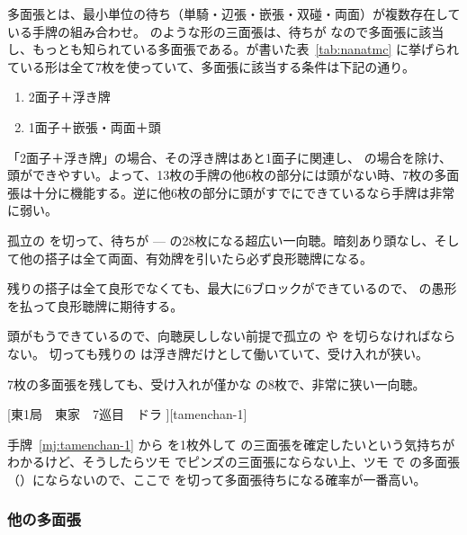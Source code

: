 \documentclass[../nankiru_main.tex]{subfiles}
\begin{document}
多面張とは、最小単位の待ち（単騎・辺張・嵌張・双碰・両面）が複数存在している手牌の組み合わせ。 のような形の三面張は、待ちが  なので多面張に該当し、もっとも知られている多面張である。\citet[pp. 124--125]{uzaku-haikouritsu}が書いた表~\ref{tab:nanatmc} に挙げられている形は全て7枚を使っていて、多面張に該当する条件は下記の通り。

\begin{enumerate}
\item 2面子＋浮き牌
\item 1面子＋嵌張・両面＋頭
\end{enumerate}

「2面子＋浮き牌」の場合、その浮き牌はあと1面子に関連し、 の場合を除け、頭ができやすい。よって、13枚の手牌の他6枚の部分には頭がない時、7枚の多面張は十分に機能する。逆に他6枚の部分に頭がすでにできているなら手牌は非常に弱い。


孤立の  を切って、待ちが  ---  の28枚になる超広い一向聴。暗刻あり頭なし、そして他の搭子は全て両面、有効牌を引いたら必ず良形聴牌になる。


残りの搭子は全て良形でなくても、最大に6ブロックができているので、 の愚形を払って良形聴牌に期待する。


頭がもうできているので、向聴戻ししない前提で孤立の  や  を切らなければならない。 切っても残りの  は浮き牌だけとして働いていて、受け入れが狭い。


7枚の多面張を残しても、受け入れが僅かな  の8枚で、非常に狭い一向聴。

[東1局　東家　7巡目　ドラ ][tamenchan-1]

手牌~\ref{mj:tamenchan-1} から  を1枚外して  の三面張を確定したいという気持ちがわかるけど、そうしたらツモ  でピンズの三面張にならない上、ツモ  で  の多面張（）にならないので、ここで  を切って多面張待ちになる確率が一番高い\citep[][p.~22]{uzaku-nankiru}。

\subsubsection*{他の多面張}
\end{document}
